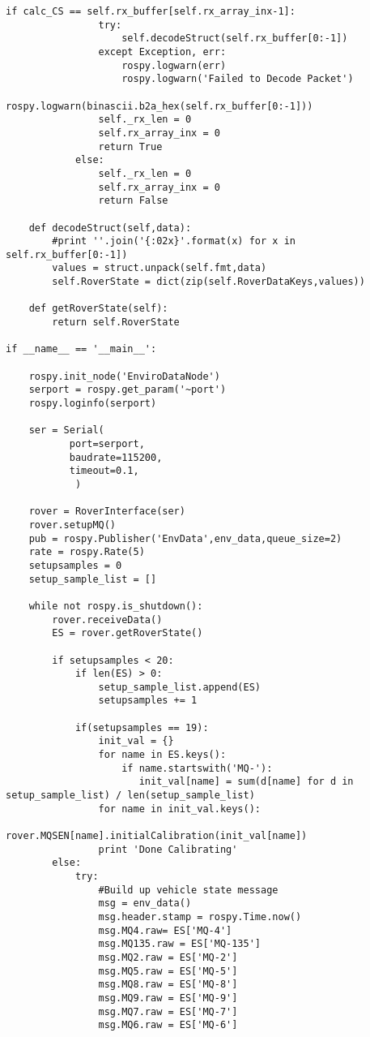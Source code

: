 \begin{lstlisting}[breaklines=true,basicstyle=\tiny]
            if calc_CS == self.rx_buffer[self.rx_array_inx-1]:
                try:
                    self.decodeStruct(self.rx_buffer[0:-1])
                except Exception, err:
                    rospy.logwarn(err)
                    rospy.logwarn('Failed to Decode Packet')
                    rospy.logwarn(binascii.b2a_hex(self.rx_buffer[0:-1]))
                self._rx_len = 0
                self.rx_array_inx = 0
                return True
            else:
                self._rx_len = 0
                self.rx_array_inx = 0
                return False

    def decodeStruct(self,data):
        #print ''.join('{:02x}'.format(x) for x in self.rx_buffer[0:-1])
        values = struct.unpack(self.fmt,data)
        self.RoverState = dict(zip(self.RoverDataKeys,values))

    def getRoverState(self):
        return self.RoverState

if __name__ == '__main__':

    rospy.init_node('EnviroDataNode')
    serport = rospy.get_param('~port')
    rospy.loginfo(serport)

    ser = Serial(
           port=serport,
           baudrate=115200,
           timeout=0.1,
            )

    rover = RoverInterface(ser)
    rover.setupMQ()
    pub = rospy.Publisher('EnvData',env_data,queue_size=2)
    rate = rospy.Rate(5)
    setupsamples = 0
    setup_sample_list = []

    while not rospy.is_shutdown():
        rover.receiveData()
        ES = rover.getRoverState()
        
        if setupsamples < 20:
            if len(ES) > 0:
                setup_sample_list.append(ES)
                setupsamples += 1

            if(setupsamples == 19):
                init_val = {}
                for name in ES.keys():
                    if name.startswith('MQ-'):
                       init_val[name] = sum(d[name] for d in setup_sample_list) / len(setup_sample_list)
                for name in init_val.keys():
                    rover.MQSEN[name].initialCalibration(init_val[name])
                print 'Done Calibrating'
        else:
            try:
                #Build up vehicle state message
                msg = env_data()
                msg.header.stamp = rospy.Time.now()
                msg.MQ4.raw= ES['MQ-4']
                msg.MQ135.raw = ES['MQ-135']
                msg.MQ2.raw = ES['MQ-2']
                msg.MQ5.raw = ES['MQ-5']
                msg.MQ8.raw = ES['MQ-8']
                msg.MQ9.raw = ES['MQ-9']
                msg.MQ7.raw = ES['MQ-7']
                msg.MQ6.raw = ES['MQ-6']


\end{lstlisting}
